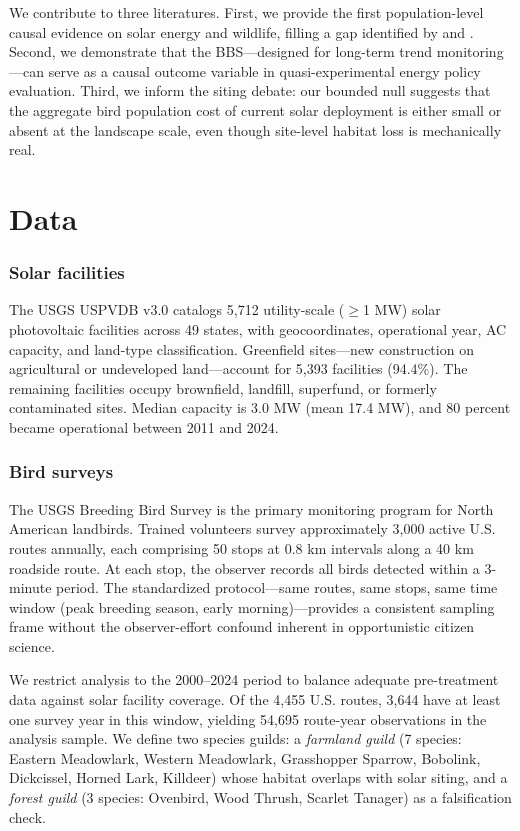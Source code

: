 \documentclass[12pt]{article}
\begin{document}
We contribute to three literatures. First, we provide the first population-level causal evidence on solar energy and wildlife, filling a gap identified by \citet{hernandez2014} and \citet{northrup2012}. Second, we demonstrate that the BBS---designed for long-term trend monitoring---can serve as a causal outcome variable in quasi-experimental energy policy evaluation. Third, we inform the siting debate: our bounded null suggests that the aggregate bird population cost of current solar deployment is either small or absent at the landscape scale, even though site-level habitat loss is mechanically real.

\section{Data}

\subsubsection*{Solar facilities} The USGS USPVDB v3.0 \citep{usgs_uspvdb2025} catalogs 5,712 utility-scale ($\geq$1 MW) solar photovoltaic facilities across 49 states, with geocoordinates, operational year, AC capacity, and land-type classification. Greenfield sites---new construction on agricultural or undeveloped land---account for 5,393 facilities (94.4\%). The remaining facilities occupy brownfield, landfill, superfund, or formerly contaminated sites. Median capacity is 3.0 MW (mean 17.4 MW), and 80 percent became operational between 2011 and 2024.

\subsubsection*{Bird surveys} The USGS Breeding Bird Survey \citep{sauer2017, usgs_bbs2025} is the primary monitoring program for North American landbirds. Trained volunteers survey approximately 3,000 active U.S. routes annually, each comprising 50 stops at 0.8 km intervals along a 40 km roadside route. At each stop, the observer records all birds detected within a 3-minute period. The standardized protocol---same routes, same stops, same time window (peak breeding season, early morning)---provides a consistent sampling frame without the observer-effort confound inherent in opportunistic citizen science.

We restrict analysis to the 2000--2024 period to balance adequate pre-treatment data against solar facility coverage. Of the 4,455 U.S. routes, 3,644 have at least one survey year in this window, yielding 54,695 route-year observations in the analysis sample. We define two species guilds: a \textit{farmland guild} (7 species: Eastern Meadowlark, Western Meadowlark, Grasshopper Sparrow, Bobolink, Dickcissel, Horned Lark, Killdeer) whose habitat overlaps with solar siting, and a \textit{forest guild} (3 species: Ovenbird, Wood Thrush, Scarlet Tanager) as a falsification check.
\end{document}
